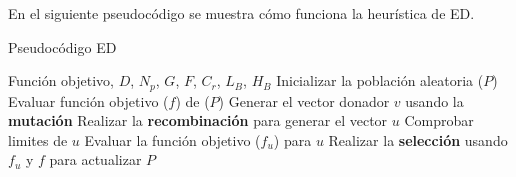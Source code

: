 \documentclass[10pt,a4paper]{article}
\begin{document}
En el siguiente pseudocódigo se muestra cómo funciona la heurística de ED.

\begin{algorithm}
\caption{Pseudocódigo ED}
\begin{algorithmic}[1]
\REQUIRE Función objetivo, $D$, $N_{p}$, $G$, $F$, $C_{r}$, $L_{B}$, $H_{B}$ 
\STATE Inicializar la población aleatoria ($P$)
\STATE Evaluar función objetivo ($f$) de ($P$)
		\STATE Generar el vector donador $v$ usando la \textbf{mutación}
		\STATE Realizar la \textbf{recombinación} para generar el vector $u$
	\ENDFOR
		\STATE Comprobar limites de $u$
		\STATE Evaluar la función objetivo ($f_{u}$) para $u$ 
		\STATE Realizar la \textbf{selección} usando $f_{u}$ y $f$ para actualizar $P$
	\ENDFOR
\ENDFOR
\end{algorithmic}
\end{algorithm}




%
%
%
%
%
%
%
%
%
%
%
%
%
%
%
%
%
\end{document}
